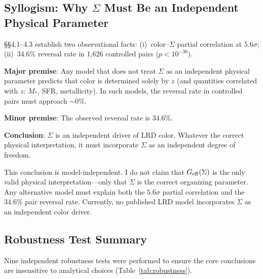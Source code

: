 \documentclass[apj,twocolumn,longbibliography,linenumbers]{aastex701}
\begin{document}
\subsection{Syllogism: Why $\Sigma$ Must Be an Independent Physical Parameter}

\S\S4.1--4.3 establish two observational facts: (i)~color--$\Sigma$ partial correlation at $5.6\sigma$; (ii)~34.6\% reversal rate in 1,626 controlled pairs ($p < 10^{-30}$).

\textbf{Major premise}: Any model that does not treat $\Sigma$ as an independent physical parameter predicts that color is determined solely by $z$ (and quantities correlated with $z$: $M_*$, SFR, metallicity). In such models, the reversal rate in controlled pairs must approach ${\sim}0\%$.

\textbf{Minor premise}: The observed reversal rate is 34.6\%.

\textbf{Conclusion}: $\Sigma$ is an independent driver of LRD color. Whatever the correct physical interpretation, it must incorporate $\Sigma$ as an independent degree of freedom.

This conclusion is model-independent. I do not claim that $G_{\rm eff}(\Sigma)$ is the only valid physical interpretation---only that $\Sigma$ is the correct organizing parameter. Any alternative model must explain both the $5.6\sigma$ partial correlation and the 34.6\% pair reversal rate. Currently, no published LRD model incorporates $\Sigma$ as an independent color driver.

\subsection{Robustness Test Summary}

Nine independent robustness tests were performed to ensure the core conclusions are insensitive to analytical choices (Table~\ref{tab:robustness}).
\end{document}
